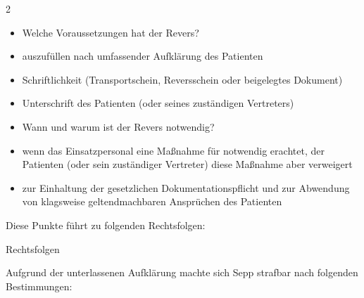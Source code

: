 \documentclass{article}
\begin{document}
\begin{multicols}{2}
\begin{itemize}
\end{itemize}
\begin{itemize}
\item Welche Voraussetzungen hat der Revers?

\end{itemize}
\begin{itemize}
\item  auszuf\"ullen nach umfassender Aufkl\"arung des Patienten

\item  Schriftlichkeit (Transportschein, Reversschein oder beigelegtes
Dokument)

\item  Unterschrift des Patienten (oder seines zust\"andigen Vertreters)

\end{itemize}
\begin{itemize}
\item Wann und warum ist der Revers notwendig?

\end{itemize}
\begin{itemize}
\item  wenn das Einsatzpersonal eine Ma{\ss}nahme f\"ur notwendig
erachtet, der Patienten  (oder sein zust\"andiger Vertreter) diese
Ma{\ss}nahme aber verweigert

\item  zur Einhaltung der gesetzlichen Dokumentationspflicht und zur
Abwendung von  klagsweise geltendmachbaren Anspr\"uchen des Patienten

\end{itemize}
\end{multicols}
Diese Punkte f\"uhrt zu folgenden Rechtsfolgen:

Rechtsfolgen

Aufgrund der unterlassenen Aufkl\"arung machte sich Sepp strafbar nach
folgenden Bestimmungen:
\end{document}
